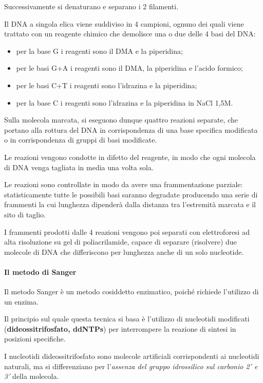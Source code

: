 \documentclass[]{article}
\begin{document}
Successivamente si denaturano e separano i 2 filamenti.

Il DNA a singola elica viene suddiviso in 4 campioni, ognuno dei quali
viene trattato con un reagente chimico che demolisce una o due delle 4
basi del DNA:

\begin{itemize}
\itemsep1pt\parskip0pt
\item
  per la base G i reagenti sono il DMA e la piperidina;
\item
  per le basi G+A i reagenti sono il DMA, la piperidina e l'acido
  formico;
\item
  per le basi C+T i reagenti sono l'idrazina e la piperidina;
\item
  per la base C i reagenti sono l'idrazina e la piperidina in NaCl 1,5M.
\end{itemize}

Sulla molecola marcata, si eseguono dunque quattro reazioni separate,
che portano alla rottura del DNA in corrispondenza di una base specifica
modificata o in corrispondenza di gruppi di basi modificate.

Le reazioni vengono condotte in difetto del reagente, in modo che ogni
molecola di DNA venga tagliata in media una volta sola.

Le reazioni sono controllate in modo da avere una frammentazione
parziale: statisticamente tutte le possibili basi saranno degradate
producendo una serie di frammenti la cui lunghezza dipenderà dalla
distanza tra l'estremità marcata e il sito di taglio.

I frammenti prodotti dalle 4 reazioni vengono poi separati con
elettroforesi ad alta risoluzione su gel di poliacrilamide, capace di
separare (risolvere) due molecole di DNA che differiscono per lunghezza
anche di un solo nucleotide.

\paragraph{Il metodo di Sanger}\label{il-metodo-di-sanger}

Il metodo Sanger è un metodo cosiddetto enzimatico, poiché richiede
l'utilizzo di un enzima.

Il principio sul quale questa tecnica si basa è l'utilizzo di nucleotidi
modificati (\textbf{dideossitrifosfato, ddNTPs}) per interrompere la
reazione di sintesi in posizioni specifiche.

I nucleotidi dideossitrifosfato sono molecole artificiali corrispondenti
ai nucleotidi naturali, ma si differenziano per l'\emph{assenza del
gruppo idrossilico sul carbonio 2' e 3'} della molecola.
\end{document}
